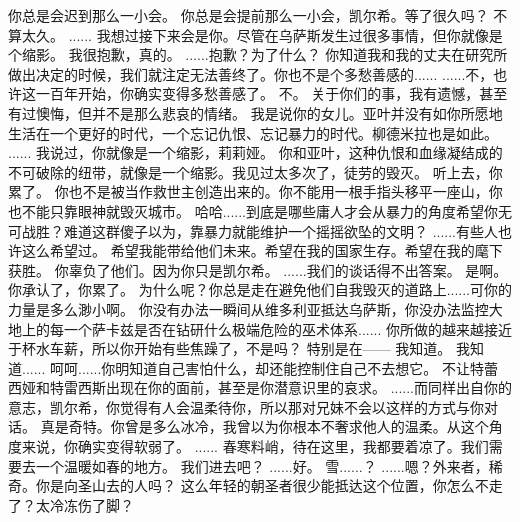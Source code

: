 \documentclass[openany]{book}
\begin{document}
\begin{dialogue}
     你总是会迟到那么一小会。
     你总是会提前那么一小会，凯尔希。等了很久吗？
     不算太久。
     ......
     我想过接下来会是你。尽管在乌萨斯发生过很多事情，但你就像是个缩影。
     我很抱歉，真的。
     ......抱歉？为了什么？
     你知道我和我的丈夫在研究所做出决定的时候，我们就注定无法善终了。你也不是个多愁善感的......
     ......不，也许这一百年开始，你确实变得多愁善感了。
     不。
     关于你们的事，我有遗憾，甚至有过懊悔，但并不是那么悲哀的情绪。
     我是说你的女儿。亚叶并没有如你所愿地生活在一个更好的时代，一个忘记仇恨、忘记暴力的时代。柳德米拉也是如此。
     ......
     我说过，你就像是一个缩影，莉莉娅。
     你和亚叶，这种仇恨和血缘凝结成的不可破除的纽带，就像是一个缩影。我见过太多次了，徒劳的毁灭。
     听上去，你累了。
     你也不是被当作救世主创造出来的。你不能用一根手指头移平一座山，你也不能只靠眼神就毁灭城市。
     哈哈......到底是哪些庸人才会从暴力的角度希望你无可战胜？难道这群傻子以为，靠暴力就能维护一个摇摇欲坠的文明？
     ......有些人也许这么希望过。
     希望我能带给他们未来。希望在我的国家生存。希望在我的麾下获胜。
     你辜负了他们。因为你只是凯尔希。
     ......我们的谈话得不出答案。
     是啊。你承认了，你累了。
     为什么呢？你总是走在避免他们自我毁灭的道路上......可你的力量是多么渺小啊。
     你没有办法一瞬间从维多利亚抵达乌萨斯，你没办法监控大地上的每一个萨卡兹是否在钻研什么极端危险的巫术体系......
     你所做的越来越接近于杯水车薪，所以你开始有些焦躁了，不是吗？
     特别是在——
     我知道。
     我知道......
     呵呵......你明知道自己害怕什么，却还能控制住自己不去想它。
     不让特蕾西娅和特雷西斯出现在你的面前，甚至是你潜意识里的哀求。
     ......而同样出自你的意志，凯尔希，你觉得有人会温柔待你，所以那对兄妹不会以这样的方式与你对话。
     真是奇特。你曾是多么冰冷，我曾以为你根本不奢求他人的温柔。从这个角度来说，你确实变得软弱了。
     ......
     春寒料峭，待在这里，我都要着凉了。我们需要去一个温暖如春的地方。
     我们进去吧？
     ......好。
     雪......？
     ......嗯？外来者，稀奇。你是向圣山去的人吗？
     这么年轻的朝圣者很少能抵达这个位置，你怎么不走了？太冷冻伤了脚？

\end{dialogue}
\end{document}
